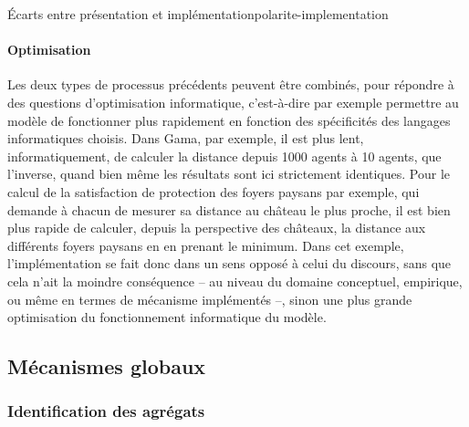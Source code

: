 \begin{encadre}{Écarts entre présentation et implémentation}{polarite-implementation}
\paragraph{Optimisation} Les deux types de processus précédents peuvent être combinés, pour répondre à des questions d'optimisation informatique, c'est-à-dire par exemple permettre au modèle de fonctionner plus rapidement en fonction des spécificités des langages informatiques choisis.
Dans Gama, par exemple, il est plus lent, informatiquement, de calculer la distance depuis 1000 agents à 10 agents, que l'inverse, quand bien même les résultats sont ici strictement identiques.
Pour le calcul de la satisfaction de protection des foyers paysans par exemple, qui demande à chacun de mesurer sa distance au château le plus proche, il est bien plus rapide de calculer, depuis la perspective des châteaux, la distance aux différents foyers paysans en en prenant le minimum.
Dans cet exemple, l'implémentation se fait donc dans un sens opposé à celui du discours, sans que cela n'ait la moindre conséquence -- au niveau du domaine conceptuel, empirique, ou même en termes de mécanisme implémentés --, sinon une plus grande optimisation du fonctionnement informatique du modèle.
\end{encadre}

\subsection{Mécanismes globaux}

\subsubsection{Identification des agrégats \label{sssec:agregats}}
	
